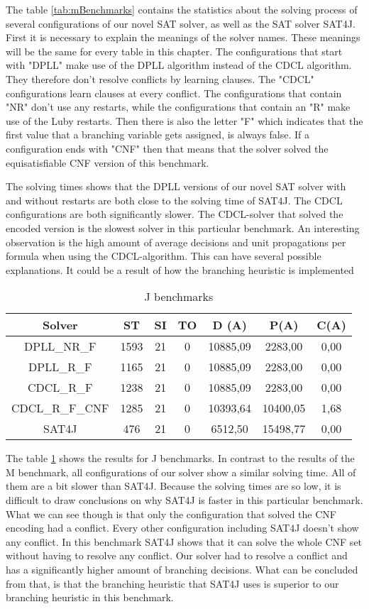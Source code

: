The table \ref{tab:mBenchmarks} contains the statistics about the solving process of several configurations of our novel SAT solver, as well as the SAT solver SAT4J. First it is necessary to explain the meanings of the solver names. These meanings will be the same for every table in this chapter. The configurations that start with "DPLL" make use of the DPLL algorithm instead of the CDCL algorithm. They therefore don't resolve conflicts by learning clauses. The "CDCL" configurations learn clauses at every conflict. The configurations that contain "NR" don't use any restarts, while the configurations that contain an "R" make use of the Luby restarts. Then there is also the letter "F" which indicates that the first value that a branching variable gets assigned, is always false. If a configuration ends with "CNF" then that means that the solver solved the equisatisfiable CNF version of this benchmark.

The solving times shows that the DPLL versions of our novel SAT solver with and without restarts are both close to the solving time of SAT4J. The CDCL configurations are both significantly slower. The CDCL-solver that solved the encoded version is the slowest solver in this particular benchmark. An interesting observation is the high amount of average decisions and unit propagations per formula when using the CDCL-algorithm. This can have several possible explanations. It could be a result of how the branching heuristic is implemented

\begin{table}[!htb]
\centering
\caption{J benchmarks}
\label{tab:jBenchmarks}
\begin{tabular}{|c|c|c|c|c|c|c|}
\hline
Solver & ST & SI & TO & D (A) & P(A) & C(A)\\
\hline
DPLL\_NR\_F & 1593 & 21 & 0 & 10885,09 & 2283,00 & 0,00 \\
\hline
DPLL\_R\_F & 1165 & 21 & 0 & 10885,09 & 2283,00 & 0,00 \\
\hline
CDCL\_R\_F & 1238 & 21 & 0 & 10885,09 & 2283,00 & 0,00 \\
\hline
CDCL\_R\_F\_CNF & 1285 & 21 & 0 & 10393,64 & 10400,05 & 1,68 \\
\hline
SAT4J & 476 & 21 & 0 & 6512,50 & 15498,77 & 0,00 \\
\hline
\end{tabular}
\end{table}

The table \ref{tab:jBenchmarks} shows the results for J benchmarks. In contrast to the results of the M benchmark, all configurations of our solver show a similar solving time. All of them are a bit slower than SAT4J. Because the solving times are so low, it is difficult to draw conclusions on why SAT4J is faster in this particular benchmark. What we can see though is that only the configuration that solved the CNF encoding had a conflict. Every other configuration including SAT4J doesn't show any conflict. In this benchmark SAT4J shows that it can solve the whole CNF set without having to resolve any conflict. Our solver had to resolve a conflict and has a significantly higher amount of branching decisions. What can be concluded from that, is that the branching heuristic that SAT4J uses is superior to our branching heuristic in this benchmark.

